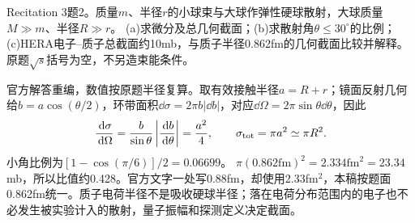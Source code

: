 \begin{exercise}\label{ex:rec-3-2}
Recitation 3题2。质量$m$、半径$r$的小球束与大球作弹性硬球散射，大球质量$M\gg m$、半径$R\gg r$。
(a)求微分及总几何截面；(b)求散射角$\theta\le30^\circ$的比例；
(c)HERA电子--质子总截面约10mb，与质子半径0.862fm的几何截面比较并解释。原题$\sqrt s$括号为空，不另造束能条件。
\end{exercise}
\begin{center}\end{center}
\begin{solution}
官方解答重编，数值按原题半径复算。取有效接触半径$a=R+r$；镜面反射几何给$b=a\cos(\theta/2)$，环带面积$\dd\sigma=2\pi b|\dd b|$，对应$\dd\Omega=2\pi\sin\theta\dd\theta$，因此
\begin{equation}
 \frac{\,\mathrm d\sigma}{\,\mathrm d\Omega}=\frac b{\sin\theta}\left|\frac{\,\mathrm d b}{\,\mathrm d\theta}\right|
 =\frac{a^2}{4},\qquad \sigma_{\rm tot}=\pi a^2\simeq\pi R^2.
\end{equation}
小角比例为$[1-\cos(\pi/6)]/2=0.06699$。
$\pi(0.862\mathrm{fm})^2=2.334\mathrm{fm}^2=23.34$mb，所以比值约0.428。官方文字一处写0.88fm，却使用2.33fm$^2$，本稿按题面0.862fm统一。质子电荷半径不是吸收硬球半径；落在电荷分布范围内的电子也不必发生被实验计入的散射，量子振幅和探测定义决定截面。
\end{solution}
